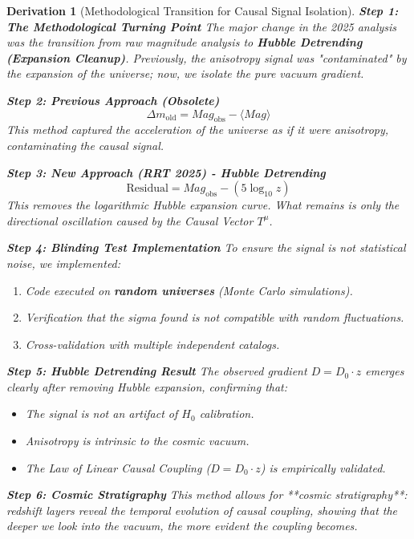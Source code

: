\documentclass[10pt, a4paper]{article}
\newtheorem{derivation}{Derivation}
\begin{document}
\begin{derivation}[Methodological Transition for Causal Signal Isolation]
\textbf{Step 1: The Methodological Turning Point}
The major change in the 2025 analysis was the transition from raw magnitude analysis to \textbf{Hubble Detrending (Expansion Cleanup)}. Previously, the anisotropy signal was "contaminated" by the expansion of the universe; now, we isolate the pure vacuum gradient.

\textbf{Step 2: Previous Approach (Obsolete)}
\begin{equation}
\Delta m_{\text{old}} = Mag_{\text{obs}} - \langle Mag \rangle
\tag{3.12}
\end{equation}
This method captured the acceleration of the universe as if it were anisotropy, contaminating the causal signal.

\textbf{Step 3: New Approach (RRT 2025) - Hubble Detrending}
\begin{equation}
\text{Residual} = Mag_{\text{obs}} - (5 \log_{10} z)
\tag{3.13}
\end{equation}
This removes the logarithmic Hubble expansion curve. What remains is only the directional oscillation caused by the Causal Vector $T^\mu$.

\textbf{Step 4: Blinding Test Implementation}
To ensure the signal is not statistical noise, we implemented:
\begin{enumerate}
\item Code executed on \textbf{random universes} (Monte Carlo simulations).
\item Verification that the sigma found is not compatible with random fluctuations.
\item Cross-validation with multiple independent catalogs.
\end{enumerate}

\textbf{Step 5: Hubble Detrending Result}
The observed gradient $D = D_0 \cdot z$ emerges clearly after removing Hubble expansion, confirming that:
\begin{itemize}
\item The signal is not an artifact of $H_0$ calibration.
\item Anisotropy is intrinsic to the cosmic vacuum.
\item The Law of Linear Causal Coupling ($D = D_0 \cdot z$) is empirically validated.
\end{itemize}

\textbf{Step 6: Cosmic Stratigraphy}
This method allows for **cosmic stratigraphy**: redshift layers reveal the temporal evolution of causal coupling, showing that the deeper we look into the vacuum, the more evident the coupling becomes.
\end{derivation}
\end{document}
